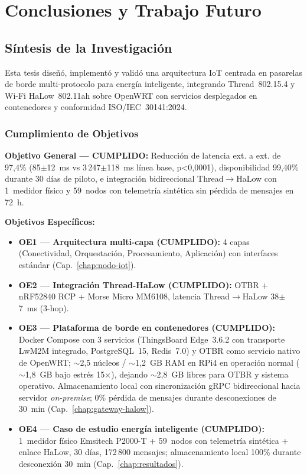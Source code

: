 \chapter{Conclusiones y Trabajo Futuro}
\label{chap:conclusiones}

\section{Síntesis de la Investigación}

Esta tesis diseñó, implementó y validó una arquitectura IoT centrada en pasarelas de borde multi-protocolo para energía inteligente, integrando Thread~802.15.4 y Wi-Fi HaLow~802.11ah sobre OpenWRT con servicios desplegados en contenedores y conformidad ISO/IEC~30141:2024.

\subsection{Cumplimiento de Objetivos}

\textbf{Objetivo General --- CUMPLIDO:} Reducción de latencia ext. a ext. de 97,4\% (85$\pm$12~ms vs 3\,247$\pm$118~ms línea base, p<0,0001), disponibilidad 99,40\% durante 30 días de piloto, e integración bidireccional Thread$\rightarrow$HaLow con 1~medidor físico y 59~nodos con telemetría sintética sin pérdida de mensajes en 72~h.

\textbf{Objetivos Específicos:}
\begin{itemize}
\item \textbf{OE1 --- Arquitectura multi-capa (CUMPLIDO):} 4 capas (Conectividad, Orquestación, Procesamiento, Aplicación) con interfaces estándar (Cap.~\ref{chap:nodo-iot}).
\item \textbf{OE2 --- Integración Thread-HaLow (CUMPLIDO):} OTBR + nRF52840 RCP + Morse Micro MM6108, latencia Thread$\rightarrow$HaLow 38$\pm$7~ms (3-hop).
\item \textbf{OE3 --- Plataforma de borde en contenedores (CUMPLIDO):} Docker Compose con 3 servicios (ThingsBoard Edge~3.6.2 con transporte LwM2M integrado, PostgreSQL~15, Redis~7.0) y OTBR como servicio nativo de OpenWRT; $\sim$2,5 núcleos / $\sim$1,2~GB RAM en RPi4 en operación normal ($\sim$1,8~GB bajo estrés 15$\times$), dejando $\sim$2,8~GB libres para OTBR y sistema operativo. Almacenamiento local con sincronización gRPC bidireccional hacia servidor \emph{on-premise}; 0\% pérdida de mensajes durante desconexiones de 30~min (Cap.~\ref{chap:gateway-halow}).
\item \textbf{OE4 --- Caso de estudio energía inteligente (CUMPLIDO):} 1~medidor físico Emsitech P2000-T + 59~nodos con telemetría sintética + enlace HaLow, 30 días, 172\,800 mensajes; almacenamiento local 100\% durante desconexión 30~min (Cap.~\ref{chap:resultados}).
\end{itemize}

